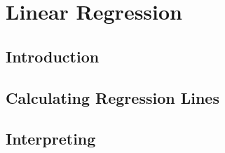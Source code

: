 \documentclass[../maths.tex]{subfiles}
\begin{document}
\chapter{Linear Regression}
\section{Introduction}
\section{Calculating Regression Lines}
\section{Interpreting}
\end{document}
